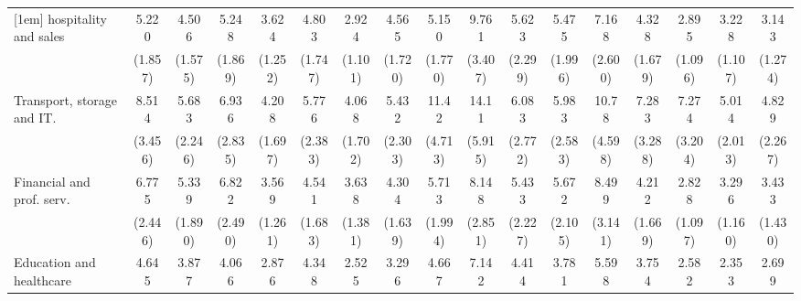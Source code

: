 {\begin{tabular}{l*{16}{c}}
[1em]
hospitality and sales&       5.220\sym{***}&       4.506\sym{***}&       5.248\sym{***}&       3.624\sym{***}&       4.803\sym{***}&       2.924\sym{**} &       4.565\sym{***}&       5.150\sym{***}&       9.761\sym{***}&       5.623\sym{***}&       5.475\sym{***}&       7.168\sym{***}&       4.328\sym{***}&       2.895\sym{**} &       3.228\sym{***}&       3.143\sym{**} \\
                    &     (1.857)         &     (1.575)         &     (1.869)         &     (1.252)         &     (1.747)         &     (1.101)         &     (1.720)         &     (1.770)         &     (3.407)         &     (2.299)         &     (1.996)         &     (2.600)         &     (1.679)         &     (1.096)         &     (1.107)         &     (1.274)         \\
[1em]
Transport, storage and IT.&       8.514\sym{***}&       5.683\sym{***}&       6.936\sym{***}&       4.208\sym{***}&       5.776\sym{***}&       4.068\sym{***}&       5.432\sym{***}&       11.42\sym{***}&       14.11\sym{***}&       6.083\sym{***}&       5.983\sym{***}&       10.78\sym{***}&       7.283\sym{***}&       7.274\sym{***}&       5.014\sym{***}&       4.829\sym{***}\\
                    &     (3.456)         &     (2.246)         &     (2.835)         &     (1.697)         &     (2.383)         &     (1.702)         &     (2.303)         &     (4.713)         &     (5.915)         &     (2.772)         &     (2.583)         &     (4.598)         &     (3.288)         &     (3.204)         &     (2.013)         &     (2.267)         \\
[1em]
Financial and prof. serv.&       6.775\sym{***}&       5.339\sym{***}&       6.822\sym{***}&       3.569\sym{***}&       4.541\sym{***}&       3.638\sym{***}&       4.304\sym{***}&       5.713\sym{***}&       8.148\sym{***}&       5.433\sym{***}&       5.672\sym{***}&       8.499\sym{***}&       4.212\sym{***}&       2.828\sym{**} &       3.296\sym{***}&       3.433\sym{**} \\
                    &     (2.446)         &     (1.890)         &     (2.490)         &     (1.261)         &     (1.683)         &     (1.381)         &     (1.639)         &     (1.994)         &     (2.851)         &     (2.227)         &     (2.105)         &     (3.141)         &     (1.669)         &     (1.097)         &     (1.160)         &     (1.430)         \\
[1em]
Education and healthcare&       4.645\sym{***}&       3.877\sym{***}&       4.066\sym{***}&       2.876\sym{**} &       4.348\sym{***}&       2.525\sym{*}  &       3.296\sym{**} &       4.667\sym{***}&       7.142\sym{***}&       4.414\sym{***}&       3.781\sym{***}&       5.598\sym{***}&       3.754\sym{***}&       2.582\sym{*}  &       2.353\sym{*}  &       2.699\sym{*}  \\

\end{tabular}}
